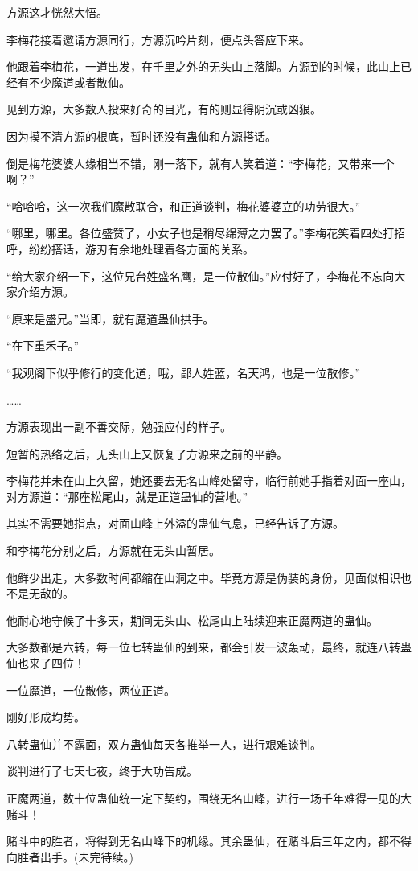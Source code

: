 \begin{this_body}
方源这才恍然大悟。

李梅花接着邀请方源同行，方源沉吟片刻，便点头答应下来。

他跟着李梅花，一道出发，在千里之外的无头山上落脚。方源到的时候，此山上已经有不少魔道或者散仙。

见到方源，大多数人投来好奇的目光，有的则显得阴沉或凶狠。

因为摸不清方源的根底，暂时还没有蛊仙和方源搭话。

倒是梅花婆婆人缘相当不错，刚一落下，就有人笑着道：“李梅花，又带来一个啊？”

“哈哈哈，这一次我们魔散联合，和正道谈判，梅花婆婆立的功劳很大。”

“哪里，哪里。各位盛赞了，小女子也是稍尽绵薄之力罢了。”李梅花笑着四处打招呼，纷纷搭话，游刃有余地处理着各方面的关系。

“给大家介绍一下，这位兄台姓盛名鹰，是一位散仙。”应付好了，李梅花不忘向大家介绍方源。

“原来是盛兄。”当即，就有魔道蛊仙拱手。

“在下重禾子。”

“我观阁下似乎修行的变化道，哦，鄙人姓蓝，名天鸿，也是一位散修。”

……

方源表现出一副不善交际，勉强应付的样子。

短暂的热络之后，无头山上又恢复了方源来之前的平静。

李梅花并未在山上久留，她还要去无名山峰处留守，临行前她手指着对面一座山，对方源道：“那座松尾山，就是正道蛊仙的营地。”

其实不需要她指点，对面山峰上外溢的蛊仙气息，已经告诉了方源。

和李梅花分别之后，方源就在无头山暂居。

他鲜少出走，大多数时间都缩在山洞之中。毕竟方源是伪装的身份，见面似相识也不是无敌的。

他耐心地守候了十多天，期间无头山、松尾山上陆续迎来正魔两道的蛊仙。

大多数都是六转，每一位七转蛊仙的到来，都会引发一波轰动，最终，就连八转蛊仙也来了四位！

一位魔道，一位散修，两位正道。

刚好形成均势。

八转蛊仙并不露面，双方蛊仙每天各推举一人，进行艰难谈判。

谈判进行了七天七夜，终于大功告成。

正魔两道，数十位蛊仙统一定下契约，围绕无名山峰，进行一场千年难得一见的大赌斗！

赌斗中的胜者，将得到无名山峰下的机缘。其余蛊仙，在赌斗后三年之内，都不得向胜者出手。(未完待续。)

\end{this_body}

